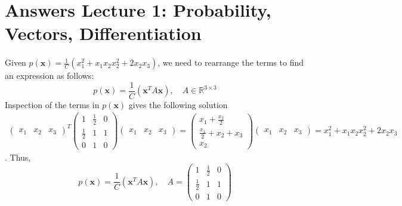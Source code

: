 \section{Answers Lecture 1: Probability, Vectors, Differentiation}

\paragraph{} 

Given $p(\textbf{x}) = \frac{1}{C}(x_1^2 + x_1x_2 x_2^2 + 2x_2x_3)$, we need to rearrange the terms to find an expression as follows:
\begin{equation}
p(\textbf{x}) = \frac{1}{C}(\textbf{x}^T A \textbf{x}), \quad A\in \mathbb{R}^{3\times 3}
\end{equation}
Inspection of the terms in $p(\textbf{x})$ gives the following solution
\begin{align*}
\begin{pmatrix}
x_1 & x_2 & x_3
\end{pmatrix}^T
\begin{pmatrix}
1 & \frac{1}{2} & 0\\
\frac{1}{2} & 1 & 1\\
0 & 1 & 0
\end{pmatrix}
\begin{pmatrix}
x_1 & x_2 & x_3
\end{pmatrix} =
\begin{pmatrix}
x_1 + \frac{x_2}{2}\\
\frac{x_1}{2} + x_2 + x_3\\
x_2
\end{pmatrix}
\begin{pmatrix}
x_1 & x_2 & x_3
\end{pmatrix} = x_1^2 + x_1x_2 x_2^2 + 2x_2x_3
\end{align*}.
Thus,
\begin{equation}
p(\textbf{x}) = \frac{1}{C}(\textbf{x}^T A \textbf{x}), \quad A = \begin{pmatrix}
1 & \frac{1}{2} & 0\\
\frac{1}{2} & 1 & 1\\
0 & 1 & 0
\end{pmatrix}
\end{equation}


